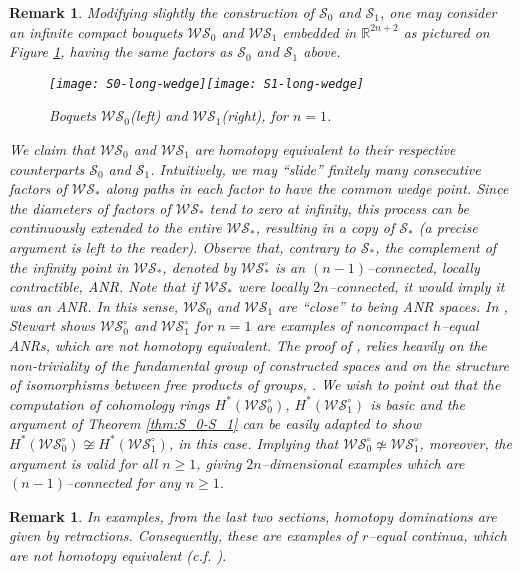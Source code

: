 \documentclass[reqno,12pt]{amsart}
\theoremstyle{ourremark}
\newtheorem{remark}[theorem]{Remark}
\numberwithin{equation}{section}
\numberwithin{theorem}{section}
\begin{document}
\begin{remark}
 Modifying slightly the construction of $\mathcal{S}_0$ and $\mathcal{S}_1$, one may consider an infinite compact bouquets $\mathcal{WS}_0$ and $\mathcal{WS}_1$ embedded in ${\mathbb{R}}^{2n+2}$ as pictured on Figure \ref{fig:S1-S0-long}, having the same factors as $\mathcal{S}_0$ and $\mathcal{S}_1$ above.
 \medskip
\begin{figure}[!ht] 
  \centering
   \texttt{[image: S0-long-wedge]}\qquad \texttt{[image: S1-long-wedge]}
  \caption{Boquets $\mathcal{WS}_0$(left) and $\mathcal{WS}_1$(right), for $n=1$.} \label{fig:S1-S0-long} 
\end{figure}  
We claim that $\mathcal{WS}_0$ and $\mathcal{WS}_1$ are homotopy equivalent to their respective counterparts $\mathcal{S}_0$ and $\mathcal{S}_1$. Intuitively, we may ``slide'' finitely many consecutive factors of $\mathcal{WS}_\ast$ along paths in each factor to have the common wedge point. Since the diameters of factors of $\mathcal{WS}_\ast$ tend to 
zero at infinity, this process can be continuously extended to the entire $\mathcal{WS}_\ast$, resulting in a copy of $\mathcal{S}_\ast$  (a precise argument is left to the reader). Observe that, contrary to $\mathcal{S}_\ast$, the complement of the infinity point in $\mathcal{WS}_\ast$, denoted by  $\mathcal{WS}^\circ_\ast$ is an $(n-1)$--connected, locally contractible, ANR. Note that if $\mathcal{WS}_\ast$ were locally $2n$--connected, it would imply it was an ANR. In this sense, $\mathcal{WS}_0$ and $\mathcal{WS}_1$ are ``close'' to being ANR spaces. In \cite{Stewart58}, Stewart shows  $\mathcal{WS}^\circ_0$ and $\mathcal{WS}^\circ_1$ for $n=1$ are examples of noncompact  $h$--equal ANRs, which are not homotopy equivalent. The proof of \cite{Stewart58}, relies heavily on the non-triviality of the fundamental group of constructed spaces and on the structure of isomorphisms between free products of groups, \cite{Stewart58}. We wish to point out that the computation of cohomology rings $H^\ast(\mathcal{WS}^\circ_0)$, $H^\ast(\mathcal{WS}^\circ_1)$ is basic and the argument of Theorem \ref{thm:S_0-S_1} can be easily adapted to show $H^\ast(\mathcal{WS}^\circ_0)\not\cong H^\ast(\mathcal{WS}^\circ_1)$, in this case. Implying that $\mathcal{WS}^\circ_0\not\simeq \mathcal{WS}^\circ_1$, moreover, the argument is valid for all $n\geq 1$, giving $2n$--dimensional examples which are $(n-1)$--connected for any $n\geq 1$. 
\end{remark}
\begin{remark}
 In examples, from the last two sections, homotopy dominations are given by retractions. Consequently, these are examples of $r$--equal continua, which are not homotopy equivalent (c.f. \cite{Borsuk67}). 
\end{remark}

  
\end{document}
